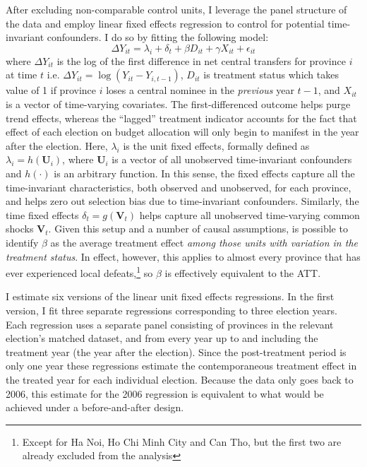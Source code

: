 \documentclass[12pt]{article}\usepackage[]{graphicx}\usepackage[]{color}
\newcommand{\1}{\mathbbm{1}}
\begin{document}
After excluding non-comparable control units, I leverage the panel structure of the data and employ linear fixed effects regression to control for potential time-invariant confounders. I do so by fitting the following model:
\begin{equation}
\Delta Y_{it} = \lambda_i + \delta_t + \beta D_{it} + \gamma X_{it} + \epsilon_{it} \tag{FE}\label{eq:FE}
\end{equation}
where $\Delta Y_{it}$ is the log of the first difference in net central transfers for province $i$ at time $t$ i.e. $\Delta Y_{it} = \log(Y_{it} - Y_{i, t-1})$, $D_{it}$ is treatment status which takes value of 1 if province $i$ loses a central nominee in the \textit{previous} year $t-1$, and $X_{it}$ is a vector of time-varying covariates. The first-differenced outcome helps purge trend effects, whereas the ``lagged'' treatment indicator accounts for the fact that effect of each election on budget allocation will only begin to manifest in the year after the election. Here, $\lambda_i$ is the unit fixed effects, formally defined as $\lambda_i= h(\mathbf{U}_i)$, where $\mathbf{U}_i$ is a vector of all unobserved time-invariant confounders and $h(\cdot)$ is an arbitrary function. In this sense, the fixed effects capture all the time-invariant characteristics, both observed and unobserved, for each province, and helps zero out selection bias due to time-invariant confounders. Similarly, the time fixed effects $\delta_t = g(\mathbf{V}_t)$ helps capture all unobserved time-varying common shocks $\mathbf{V}_t$. Given this setup and a number of causal assumptions, is possible to identify $\beta$ as the average treatment effect \textit{among those units with variation in the treatment status}. In effect, however, this applies to almost every province that has ever experienced local defeats,\footnote{Except for Ha Noi, Ho Chi Minh City and Can Tho, but the first two are already excluded from the analysis} so $\beta$ is effectively equivalent to the ATT.

I estimate six versions of the linear unit fixed effects regressions. In the first version, I fit three separate regressions corresponding to three election years. Each regression uses a separate panel consisting of provinces in the relevant election's matched dataset, and from every year up to and including the treatment year (the year after the election). Since the post-treatment period is only one year these regressions estimate the contemporaneous treatment effect in the treated year for each individual election. Because the data only goes back to 2006, this estimate for the 2006 regression is equivalent to what would be achieved under a before-and-after design. 
\end{document}
